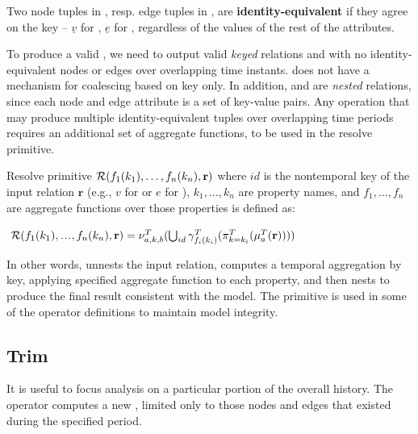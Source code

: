 \begin{definition}
Two node tuples in \tv, resp. edge tuples in \te, are {\bf
  identity-equivalent} if they agree on the key -- $\underline{v}$ for
\tv, $\underline{e}$ for \te, regardless of the values of the rest of
the attributes.
\end{definition}

To produce a valid \tg, we need to output valid {\em keyed} relations
\tv and \te with no identity-equivalent nodes or edges over
overlapping time instants.  \tra does not have a mechanism for
coalescing based on key only.  In addition, \tv and \te are {\em
  nested} relations, since each node and edge attribute is a set of
key-value pairs.  Any \tga operation that may produce multiple
identity-equivalent tuples over overlapping time periods requires an
additional set of aggregate functions, to be used in the resolve
primitive.

\begin{definition}
\label{def:resolve}
Resolve primitive $\mathcal{R}(f_1(k_1), \ldots, f_n(k_n),\mathbf{r})$
where $id$ is the nontemporal key of the input relation $\mathbf{r}$
(e.g., $v$ for \tv or $e$ for \te), $k_1, \ldots, k_n$ are property
names, and $f_1, \ldots, f_n$ are aggregate functions over those
properties is defined as:

\noindent $~\resolve{f_1(k_1)\varlist f_n(k_n)}{\mathbf{r}} = \nu^T_{a,k,b}(\bigcup
  _{id}\gamma^T_{f_i(k_i)}(\pi^T_{k=k_i}(\mu^T_a(\mathbf{r}))))$
\end{definition}

In other words,  unnests the input relation, computes a
temporal aggregation by key, applying specified aggregate function to
each property, and then nests to produce the final result consistent
with the \tg model.  The  primitive is used in some of
the \tga operator definitions to maintain model integrity.

\subsection{Trim}

It is useful to focus analysis on a particular portion of the overall
\tg history.  The  operator computes a new \tg, limited
only to those nodes and edges that existed during the specified
period.

